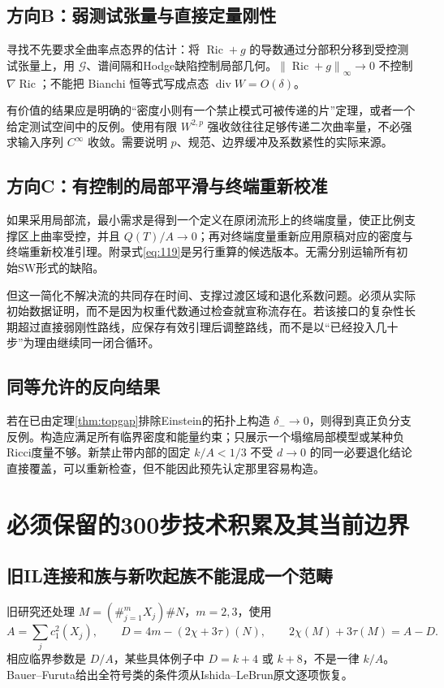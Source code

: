 \documentclass[UTF8,a4paper,11pt,fontset=fandol]{ctexart}
\numberwithin{equation}{section}
\theoremstyle{definition}
\newcommand{\Ric}{\operatorname{Ric}}
\newcommand{\norm}[1]{\left\lVert#1\right\rVert}
\begin{document}
\subsection{方向B：弱测试张量与直接定量刚性}
寻找不先要求全曲率点态界的估计：将 $\Ric+g$ 的导数通过分部积分移到受控测试张量上，用 $\mathcal G$、谱间隔和Hodge缺陷控制局部几何。$\norm{\Ric+g}_\infty\to0$ 不控制 $\nabla\Ric$；不能把 Bianchi 恒等式写成点态 $\operatorname{div}W=O(\delta)$。

有价值的结果应是明确的“密度小则有一个禁止模式可被传递的片”定理，或者一个给定测试空间中的反例。使用有限 $W^{2,p}$ 强收敛往往足够传递二次曲率量，不必强求输入序列 $C^\infty$ 收敛。需要说明 $p$、规范、边界缓冲及系数紧性的实际来源。

\subsection{方向C：有控制的局部平滑与终端重新校准}
如果采用局部流，最小需求是得到一个定义在原闭流形上的终端度量，使正比例支撑区上曲率受控，并且 $Q(T)/A\to0$；再对终端度量重新应用原稿对应的密度与终端重新校准引理。附录式\eqref{eq:119}是另行重算的候选版本。无需分别运输所有初始SW形式的缺陷。

但这一简化不解决流的共同存在时间、支撑过渡区域和退化系数问题。必须从实际初始数据证明，而不是因为权重代数通过检查就宣称流存在。若该接口的复杂性长期超过直接弱刚性路线，应保存有效引理后调整路线，而不是以“已经投入几十步”为理由继续同一闭合循环。

\subsection{同等允许的反向结果}
若在已由定理\ref{thm:topgap}排除Einstein的拓扑上构造 $\delta_-\to0$，则得到真正负分支反例。构造应满足所有临界密度和能量约束；只展示一个塌缩局部模型或某种负Ricci度量不够。新禁止带内部的固定 $k/A<1/3$ 不受 $d\to0$ 的同一必要退化结论直接覆盖，可以重新检查，但不能因此预先认定那里容易构造。


\section{必须保留的300步技术积累及其当前边界}
\subsection{旧IL连接和族与新吹起族不能混成一个范畴}
旧研究还处理 $M=(\#_{j=1}^{m}X_j)\#N$，$m=2,3$，使用
\[
A=\sum_j c_1^2(X_j),\qquad D=4m-(2\chi+3\tau)(N),\qquad
2\chi(M)+3\tau(M)=A-D.
\]
相应临界参数是 $D/A$，某些具体例子中 $D=k+4$ 或 $k+8$，不是一律 $k/A$。Bauer--Furuta给出全符号类的条件须从Ishida--LeBrun原文逐项恢复\cite{IL}。
\end{document}
